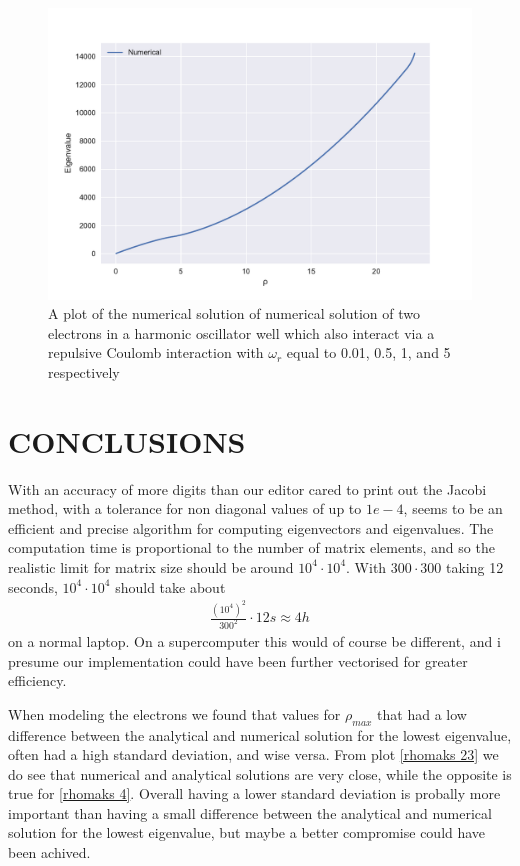 \documentclass[a4paper]{article}
\begin{document}
\begin{figure}[h!]
\includegraphics[scale=0.45]{../oppe_rho-23n-400l0-186125.pdf}
\caption{A plot of the numerical solution of numerical solution of two electrons in a harmonic oscillator well which also interact via a repulsive Coulomb interaction with $\omega_r$ equal to 0.01, 0.5, 1, and 5 respectively}
\label{opp e res}
\end{figure}


\section{CONCLUSIONS}
With an accuracy of more digits than our editor cared to print out the Jacobi method, with a tolerance for non diagonal values of up to $1e-4$, seems to be an efficient and precise algorithm for computing eigenvectors and eigenvalues. The computation time is proportional to the number of matrix elements, and so the realistic limit for matrix size should be around $10^4 \cdot 10^4$. With $300 \cdot 300$ taking 12 seconds, $10^4 \cdot 10^4$ should take about
\begin{align}
\frac{(10^4)^2}{300^2}\cdot 12s\approx 4h
\end{align}
on a normal laptop. On a supercomputer this would of course be different, and i presume our implementation could have been further vectorised for greater efficiency.

When modeling the electrons we found that values for $\rho_{max}$ that had a low difference between the analytical and numerical solution for the lowest eigenvalue, often had a high standard deviation, and wise versa. From plot \ref{rhomaks 23} we do see that numerical and analytical solutions are very close, while the opposite is true for \ref{rhomaks 4}. Overall having a lower standard deviation is probally more important than having a small difference between the analytical and numerical solution for the lowest eigenvalue, but maybe a better compromise could have been achived. 
\end{document}
